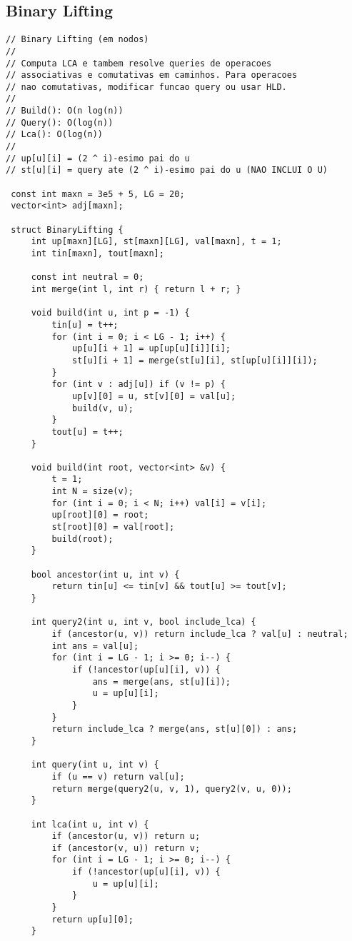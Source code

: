 \documentclass[11pt, a4paper, twoside]{article}
\begin{document}
\subsection{Binary Lifting}
\begin{lstlisting}
// Binary Lifting (em nodos)
//
// Computa LCA e tambem resolve queries de operacoes
// associativas e comutativas em caminhos. Para operacoes
// nao comutativas, modificar funcao query ou usar HLD.
//
// Build(): O(n log(n))
// Query(): O(log(n))
// Lca(): O(log(n))
//
// up[u][i] = (2 ^ i)-esimo pai do u
// st[u][i] = query ate (2 ^ i)-esimo pai do u (NAO INCLUI O U)

 const int maxn = 3e5 + 5, LG = 20;
 vector<int> adj[maxn];
 
 struct BinaryLifting {
     int up[maxn][LG], st[maxn][LG], val[maxn], t = 1;
     int tin[maxn], tout[maxn];
 
     const int neutral = 0;
     int merge(int l, int r) { return l + r; }
 
     void build(int u, int p = -1) {
         tin[u] = t++;
         for (int i = 0; i < LG - 1; i++) {
             up[u][i + 1] = up[up[u][i]][i];
             st[u][i + 1] = merge(st[u][i], st[up[u][i]][i]);
         }
         for (int v : adj[u]) if (v != p) {
             up[v][0] = u, st[v][0] = val[u];
             build(v, u);
         }
         tout[u] = t++;
     }
 
     void build(int root, vector<int> &v) {
         t = 1;
         int N = size(v);
         for (int i = 0; i < N; i++) val[i] = v[i];
         up[root][0] = root;
         st[root][0] = val[root];
         build(root);
     }
 
     bool ancestor(int u, int v) {
         return tin[u] <= tin[v] && tout[u] >= tout[v];
     }
 
     int query2(int u, int v, bool include_lca) {
         if (ancestor(u, v)) return include_lca ? val[u] : neutral;
         int ans = val[u];
         for (int i = LG - 1; i >= 0; i--) {
             if (!ancestor(up[u][i], v)) {
                 ans = merge(ans, st[u][i]);
                 u = up[u][i];
             }
         }
         return include_lca ? merge(ans, st[u][0]) : ans;
     }
 
     int query(int u, int v) { 
         if (u == v) return val[u];
         return merge(query2(u, v, 1), query2(v, u, 0));
     }
 
     int lca(int u, int v) {
         if (ancestor(u, v)) return u;
         if (ancestor(v, u)) return v;
         for (int i = LG - 1; i >= 0; i--) {
             if (!ancestor(up[u][i], v)) {
                 u = up[u][i];
             }
         }
         return up[u][0];
     }
 

\end{lstlisting}
\end{document}
